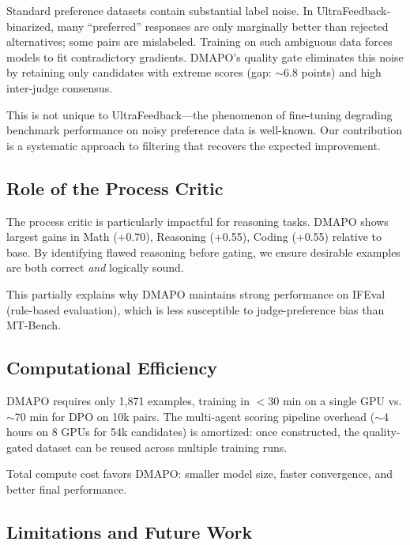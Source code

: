\documentclass{article}
\newcommand{\ours}{\textsc{DMAPO}}
\begin{document}
Standard preference datasets contain substantial label noise.
In UltraFeedback-binarized, many ``preferred'' responses are only marginally better than rejected alternatives; some pairs are mislabeled.
Training on such ambiguous data forces models to fit contradictory gradients.
\ours{}'s quality gate eliminates this noise by retaining only candidates with extreme scores (gap: $\sim$6.8 points) and high inter-judge consensus.

This is not unique to UltraFeedback---the phenomenon of fine-tuning degrading benchmark performance on noisy preference data is well-known.
Our contribution is a systematic approach to filtering that recovers the expected improvement.

\subsection{Role of the Process Critic}

The process critic is particularly impactful for reasoning tasks.
\ours{} shows largest gains in Math (+0.70), Reasoning (+0.55), Coding (+0.55) relative to base.
By identifying flawed reasoning before gating, we ensure desirable examples are both correct \emph{and} logically sound.

This partially explains why \ours{} maintains strong performance on IFEval (rule-based evaluation), which is less susceptible to judge-preference bias than MT-Bench.

\subsection{Computational Efficiency}

\ours{} requires only 1,871 examples, training in $<$30 min on a single GPU vs. $\sim$70 min for DPO on 10k pairs.
The multi-agent scoring pipeline overhead ($\sim$4 hours on 8 GPUs for 54k candidates) is amortized: once constructed, the quality-gated dataset can be reused across multiple training runs.

Total compute cost favors \ours{}: smaller model size, faster convergence, and better final performance.

\subsection{Limitations and Future Work}
\end{document}
